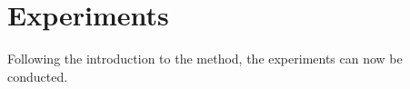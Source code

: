 \chapter{Experiments}

Following the introduction to the method, the experiments can now be conducted. 

